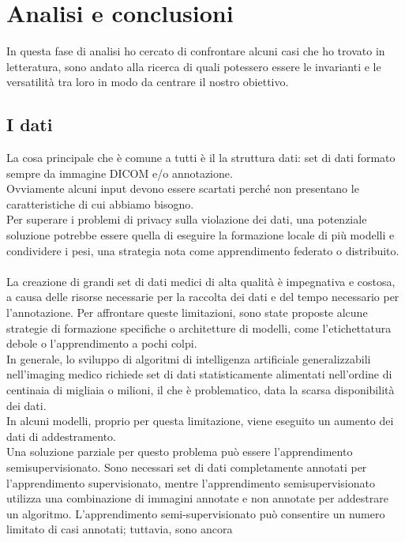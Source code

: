 \documentclass[12pt,a4paper]{report}
\begin{document}
\section{Analisi e conclusioni}
In questa fase di analisi ho cercato di confrontare alcuni casi che ho trovato in letteratura, sono andato alla ricerca di quali potessero essere le invarianti e le versatilità tra loro in modo da centrare il nostro obiettivo.\\

\subsection{I dati}
La cosa principale che è comune a tutti è il la struttura dati: set di dati formato sempre  da immagine DICOM e/o annotazione.\\
Ovviamente alcuni input devono essere scartati perché non presentano le caratteristiche di cui abbiamo bisogno.\\
Per superare i problemi di privacy sulla violazione dei dati, una potenziale soluzione potrebbe essere quella di eseguire la formazione locale di più modelli e condividere i pesi, una strategia nota come apprendimento federato o distribuito.\\
\\
La creazione di grandi set di dati medici di alta qualità è impegnativa e costosa, a causa delle risorse necessarie per la raccolta dei dati e del tempo necessario per l'annotazione. Per affrontare queste limitazioni, sono state proposte alcune strategie di formazione specifiche o architetture di modelli, come l'etichettatura debole o l'apprendimento a pochi colpi.
\\
In generale, lo sviluppo di algoritmi di intelligenza artificiale generalizzabili nell'imaging medico richiede set di dati statisticamente alimentati nell'ordine di centinaia di migliaia o milioni, il che è problematico, data la scarsa disponibilità
dei dati.\\
In alcuni modelli, proprio per questa limitazione, viene eseguito un aumento dei dati di addestramento.\\
Una soluzione parziale per questo problema può essere l'apprendimento semisupervisionato. Sono necessari
set di dati completamente annotati per l'apprendimento supervisionato, mentre l'apprendimento semisupervisionato
utilizza una combinazione di immagini annotate e non annotate per addestrare un algoritmo.
L'apprendimento semi-supervisionato può consentire un numero limitato di casi annotati; tuttavia, sono ancora 
\end{document}
